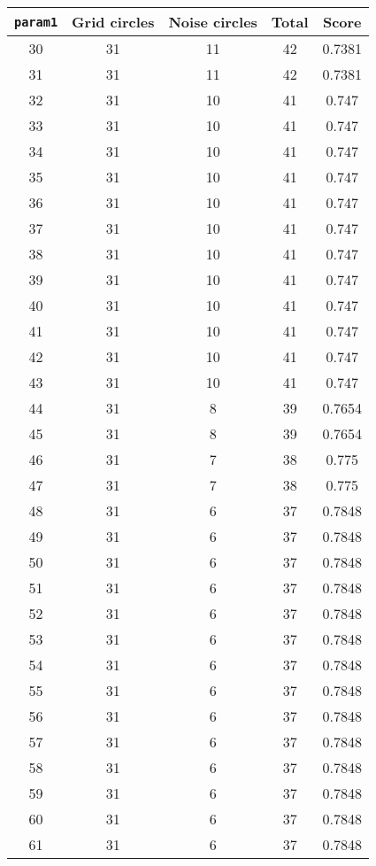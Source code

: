 \documentclass[letterpaper, 12pt]{article}
\begin{document}
\begin{longtable}{|c|c|c|c|c|}
\hline
\textbf{\texttt{param1}} & \textbf{Grid circles} & \textbf{Noise circles} & \textbf{Total} & \textbf{Score} \\
\hline
30 & 31 & 11 & 42 & 0.7381 \\
\hline
31 & 31 & 11 & 42 & 0.7381 \\
\hline
32 & 31 & 10 & 41 & 0.747 \\
\hline
33 & 31 & 10 & 41 & 0.747 \\
\hline
34 & 31 & 10 & 41 & 0.747 \\
\hline
35 & 31 & 10 & 41 & 0.747 \\
\hline
36 & 31 & 10 & 41 & 0.747 \\
\hline
37 & 31 & 10 & 41 & 0.747 \\
\hline
38 & 31 & 10 & 41 & 0.747 \\
\hline
39 & 31 & 10 & 41 & 0.747 \\
\hline
40 & 31 & 10 & 41 & 0.747 \\
\hline
41 & 31 & 10 & 41 & 0.747 \\
\hline
42 & 31 & 10 & 41 & 0.747 \\
\hline
43 & 31 & 10 & 41 & 0.747 \\
\hline
44 & 31 & 8 & 39 & 0.7654 \\
\hline
45 & 31 & 8 & 39 & 0.7654 \\
\hline
46 & 31 & 7 & 38 & 0.775 \\
\hline
47 & 31 & 7 & 38 & 0.775 \\
\hline
48 & 31 & 6 & 37 & 0.7848 \\
\hline
49 & 31 & 6 & 37 & 0.7848 \\
\hline
50 & 31 & 6 & 37 & 0.7848 \\
\hline
51 & 31 & 6 & 37 & 0.7848 \\
\hline
52 & 31 & 6 & 37 & 0.7848 \\
\hline
53 & 31 & 6 & 37 & 0.7848 \\
\hline
54 & 31 & 6 & 37 & 0.7848 \\
\hline
55 & 31 & 6 & 37 & 0.7848 \\
\hline
56 & 31 & 6 & 37 & 0.7848 \\
\hline
57 & 31 & 6 & 37 & 0.7848 \\
\hline
58 & 31 & 6 & 37 & 0.7848 \\
\hline
59 & 31 & 6 & 37 & 0.7848 \\
\hline
60 & 31 & 6 & 37 & 0.7848 \\
\hline
61 & 31 & 6 & 37 & 0.7848 \\

\end{longtable}
\end{document}
